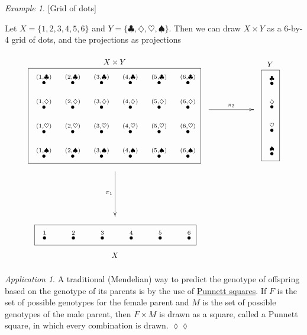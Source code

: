 \documentclass{book}
\newcommand{\LMO}[1]{\stackrel{#1}{\bullet}}
\theoremstyle{remark}
\newtheorem{example}[subsubsection]{Example}
\newtheorem{app}[subsubsection]{Application}
\newenvironment{application}{\begin{app}}{\hspace*{\fill}$\lozenge\lozenge$\end{app}}
\theoremstyle{definition}
\begin{document}
\begin{example}\label{ex:grid1}[Grid of dots]

Let $X=\{1,2,3,4,5,6\}$ and $Y=\{\clubsuit,\diamondsuit,\heartsuit,\spadesuit\}$. Then we can draw $X\times Y$ as a 6-by-4 grid of dots, and the projections as projections
\begin{align}
\parbox{2.9in}{\begin{center}\small $X\times Y$\vspace{-.1in}\end{center}\fbox{
\xymatrix@=10pt{
\LMO{(1,\clubsuit)}&\LMO{(2,\clubsuit)}&\LMO{(3,\clubsuit)}&\LMO{(4,\clubsuit)}&\LMO{(5,\clubsuit)}&\LMO{(6,\clubsuit)}\\
\LMO{(1,\diamondsuit)}&\LMO{(2,\diamondsuit)}&\LMO{(3,\diamondsuit)}&\LMO{(4,\diamondsuit)}&\LMO{(5,\diamondsuit)}&\LMO{(6,\diamondsuit)}\\
\LMO{(1,\heartsuit)}&\LMO{(2,\heartsuit)}&\LMO{(3,\heartsuit)}&\LMO{(4,\heartsuit)}&\LMO{(5,\heartsuit)}&\LMO{(6,\heartsuit)}\\
\LMO{(1,\spadesuit)}&\LMO{(2,\spadesuit)}&\LMO{(3,\spadesuit)}&\LMO{(4,\spadesuit)}&\LMO{(5,\spadesuit)}&\LMO{(6,\spadesuit)}\\
}}}
\parbox{.9in}{
\xymatrix{~\ar[rr]^{\pi_2}&&~}
}
\parbox{.3in}{\begin{center}\small $Y$\vspace{-.1in}\end{center}\fbox{
\xymatrix@=10pt{
\LMO{\clubsuit}\\\LMO{\diamondsuit}\\\LMO{\heartsuit}\\\LMO{\spadesuit}
}}}
\\\nonumber
\parbox{1in}{\hspace{-1.95in}\xymatrix{~\ar[dd]_{\pi_1}\\\\~}}
\\\nonumber
\parbox{2.9in}{\hspace{-1.2in}\fbox{
\xymatrix@=24pt{
\LMO{1}&\LMO{2}&\LMO{3}&\LMO{4}&\LMO{5}&\LMO{6}
}}\begin{center}\hspace{-2.6in}\small$X$\end{center}}
\end{align}

\end{example}

\begin{application}
A traditional (Mendelian) way to predict the genotype of offspring based on the genotype of its parents is by the use of \href{http://en.wikipedia.org/wiki/Punnett_square}{Punnett squares}. If $F$ is the set of possible genotypes for the female parent and $M$ is the set of possible genotypes of the male parent, then $F\times M$ is drawn as a square, called a Punnett square, in which every combination is drawn. 
\end{application}
\end{document}
